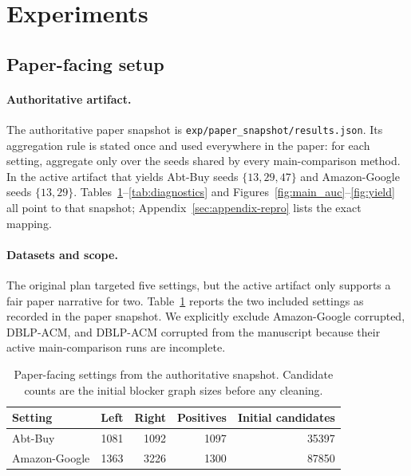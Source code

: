 \documentclass{article}
\begin{document}
\section{Experiments}
\label{sec:experiments}

\subsection{Paper-facing setup}

\paragraph{Authoritative artifact.}
The authoritative paper snapshot is \texttt{exp/paper\_snapshot/results.json}. Its aggregation rule is stated once and used everywhere in the paper: for each setting, aggregate only over the seeds shared by every main-comparison method. In the active artifact that yields Abt-Buy seeds $\{13,29,47\}$ and Amazon-Google seeds $\{13,29\}$. Tables~\ref{tab:datasets}--\ref{tab:diagnostics} and Figures~\ref{fig:main_auc}--\ref{fig:yield} all point to that snapshot; Appendix~\ref{sec:appendix-repro} lists the exact mapping.

\paragraph{Datasets and scope.}
The original plan targeted five settings, but the active artifact only supports a fair paper narrative for two. Table~\ref{tab:datasets} reports the two included settings as recorded in the paper snapshot. We explicitly exclude Amazon-Google corrupted, DBLP-ACM, and DBLP-ACM corrupted from the manuscript because their active main-comparison runs are incomplete.

\begin{table}[t]
\caption{Paper-facing settings from the authoritative snapshot. Candidate counts are the initial blocker graph sizes before any cleaning.}
\label{tab:datasets}
\centering
\small
\begin{tabular}{lrrrr}
\toprule
Setting & Left & Right & Positives & Initial candidates \\
\midrule
Abt-Buy & 1081 & 1092 & 1097 & 35397 \\
Amazon-Google & 1363 & 3226 & 1300 & 87850 \\
\bottomrule
\end{tabular}
\end{table}
\end{document}
